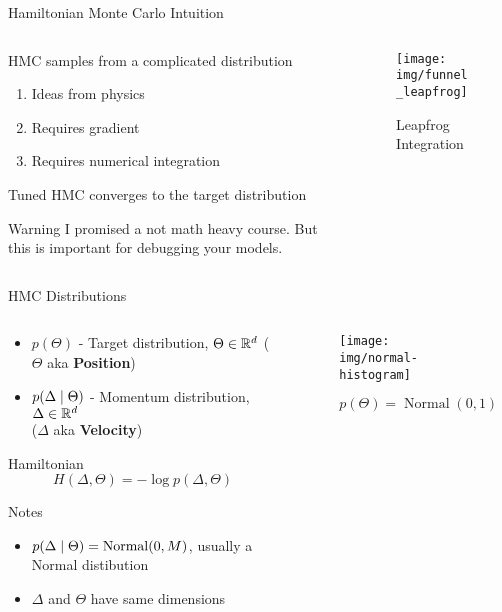 \documentclass{beamer}
\begin{document}
\begin{frame}{Hamiltonian Monte Carlo Intuition}
\begin{columns}
\begin{column}{0.5\linewidth}
HMC samples from a complicated distribution
\begin{enumerate}
    \item Ideas from physics
    \item Requires gradient
    \item Requires numerical integration
\end{enumerate}
Tuned HMC converges to the target distribution
\begin{alertblock}{Warning}
I promised a not math heavy course. But this is important for debugging your models.
\end{alertblock}
\end{column}
\begin{column}{0.5\linewidth}
\begin{figure}
    \centering
    \texttt{[image: img/funnel\_leapfrog]}
    \caption{Leapfrog Integration}
\end{figure}
\end{column}
\end{columns}
\end{frame}
\begin{frame}{HMC Distributions}
\begin{columns}
\begin{column}{0.5\linewidth}
\begin{itemize}
    \item $p(\Theta)$ - Target distribution, $\Theta \in {\mathbb{R}}^d$ ($\Theta$ aka \textbf{Position})
    \item $p(\Delta\;|\;\Theta)$ - Momentum distribution, $\Delta \in {\mathbb{R}}^d$ \\($\Delta$ aka \textbf{Velocity})
\end{itemize}
Hamiltonian
\begin{equation*}
 H(\Delta, \Theta) = -\log p(\Delta, \Theta)   
\end{equation*}
\begin{block}{Notes}
\begin{itemize}
    \item $p(\Delta\;|\;\Theta) = \operatorname{Normal}(0, M)$, usually a Normal distibution
    \item $\Delta$ and $\Theta$ have same dimensions
\end{itemize}

\end{block}
\end{column}
\begin{column}{0.5\linewidth}
\begin{figure}
    \centering
    \texttt{[image: img/normal-histogram]}
    \caption{$p(\Theta) = \operatorname{Normal}(0, 1)$}
\end{figure}
\end{column}
\end{columns}
\end{frame}
\end{document}
